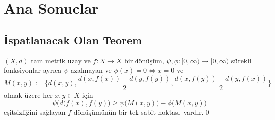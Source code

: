 \documentclass[sans,mathserif,8pt]{beamer}
\begin{document}
\section{Ana Sonuclar}
\subsection{\.{I}spatlanacak Olan Teorem}
\begin{frame}
  \begin{theorem}
    $(X,d)$  tam metrik uzay ve $f: X \rightarrow X$ bir d\"{o}n\"{u}\c{s}\"{u}m, $\psi,\phi : [0,\infty)\to [0,\infty)$ s\"urekli fonksiyonlar ayr\i ca $\psi$ azalmayan ve $\phi(x)=0 \iff x=0$ ve $$M(x,y):=\bigg\{ d(x,y), \frac{d(x,f(x))+d(y,f(y))}{2}, \frac{d(x,f(y))+d(y,f(x))}{2} \bigg\}$$ olmak \"{u}zere her $x,y \in X$ i\c{c}in $$\psi\big(d(f(x),f(y)\big)\geq \psi\big(M(x,y)\big)-\phi\big(M(x,y)\big)$$ e\c{s}itsizli\u{g}ini sa\u{g}layan $f$ d\"{o}n\"{u}\c{s}\"{u}m\"un\"un bir tek sabit noktas\i\ vard\i r.\qed 
  \end{theorem}
\end{frame}%
\end{document}

